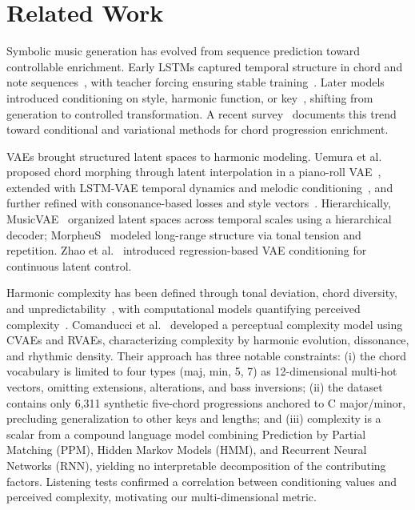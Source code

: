 \documentclass[conference]{IEEEtran}
\begin{document}
\section{Related Work}
\label{sec:relatedwork}

Symbolic music generation has evolved from sequence prediction toward controllable enrichment. Early LSTMs captured temporal structure in chord and note sequences~\cite{eck2002first,oore2020time2}, with teacher forcing ensuring stable training~\cite{williams1989learning}. Later models introduced conditioning on style, harmonic function, or key~\cite{roberts2017musicvae,herremans2017functional}, shifting from generation to controlled transformation. A recent survey~\cite{Ji2023} documents this trend toward conditional and variational methods for chord progression enrichment.

VAEs brought structured latent spaces to harmonic modeling. Uemura et al. proposed chord morphing through latent interpolation in a piano-roll VAE~\cite{uemura2018preliminary}, extended with LSTM-VAE temporal dynamics and melodic conditioning~\cite{uemura2020morphing}, and further refined with consonance-based losses and style vectors~\cite{uemura2022morphing}. Hierarchically, MusicVAE~\cite{roberts2017musicvae} organized latent spaces across temporal scales using a hierarchical decoder; MorpheuS~\cite{herremans2017functional} modeled long-range structure via tonal tension and repetition. Zhao et al.~\cite{zhao2019variational} introduced regression-based VAE conditioning for continuous latent control.

Harmonic complexity has been defined through tonal deviation, chord diversity, and unpredictability~\cite{rohrmeier2012comparing,temperley2004cognition}, with computational models quantifying perceived complexity~\cite{digiorgi2017modeling}. Comanducci et al.~\cite{comanducci2023vae} developed a perceptual complexity model using CVAEs and RVAEs, characterizing complexity by harmonic evolution, dissonance, and rhythmic density. Their approach has three notable constraints: (i) the chord vocabulary is limited to four types (maj, min, 5, 7) as 12-dimensional multi-hot vectors, omitting extensions, alterations, and bass inversions; (ii) the dataset contains only 6,311 synthetic five-chord progressions anchored to C major/minor, precluding generalization to other keys and lengths; and (iii) complexity is a scalar from a compound language model combining Prediction by Partial Matching (PPM), Hidden Markov Models (HMM), and Recurrent Neural Networks (RNN), yielding no interpretable decomposition of the contributing factors. Listening tests confirmed a correlation between conditioning values and perceived complexity, motivating our multi-dimensional metric.
\end{document}
